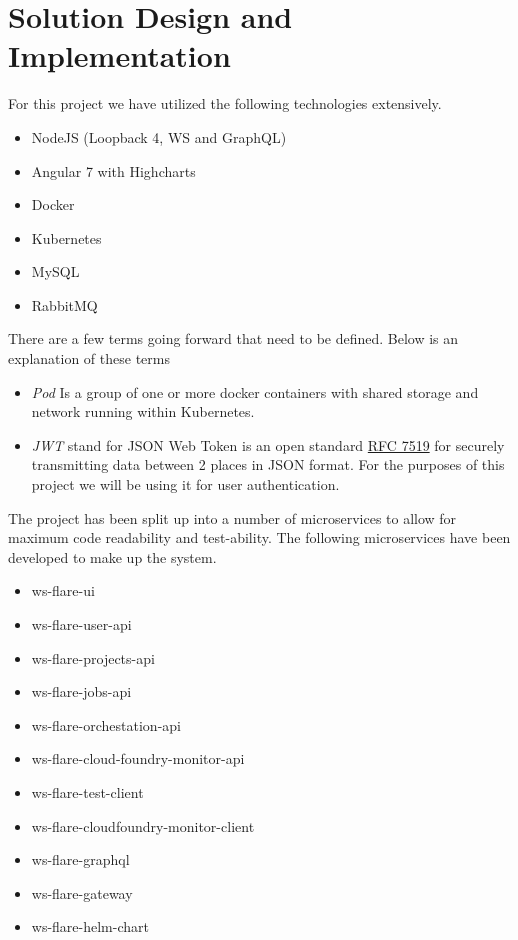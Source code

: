 \chapter{Solution Design and Implementation}

For this project we have utilized the following technologies extensively.

\begin{itemize}
  \item NodeJS (Loopback 4, WS and GraphQL)
  \item Angular 7 with Highcharts
  \item Docker
  \item Kubernetes
  \item MySQL
  \item RabbitMQ
\end{itemize}

There are a few terms going forward that need to be defined. Below is an explanation of these terms

\begin{itemize}
  \item \emph{Pod} Is a group of one or more docker containers with shared storage and network running within Kubernetes.
  \item \emph{JWT} stand for JSON Web Token is an open standard \href{https://tools.ietf.org/html/rfc7519}{RFC 7519} for securely transmitting data between 2 places in JSON format. For the purposes of this project we will be using it for user authentication.
\end{itemize}


The project has been split up into a number of microservices to allow for maximum code readability and test-ability. The following microservices have been developed to make up the system.

\begin{itemize}
  \item ws-flare-ui
  \item ws-flare-user-api
  \item ws-flare-projects-api
  \item ws-flare-jobs-api
  \item ws-flare-orchestation-api
  \item ws-flare-cloud-foundry-monitor-api
  \item ws-flare-test-client
  \item ws-flare-cloudfoundry-monitor-client
  \item ws-flare-graphql
  \item ws-flare-gateway
  \item ws-flare-helm-chart
\end{itemize}

